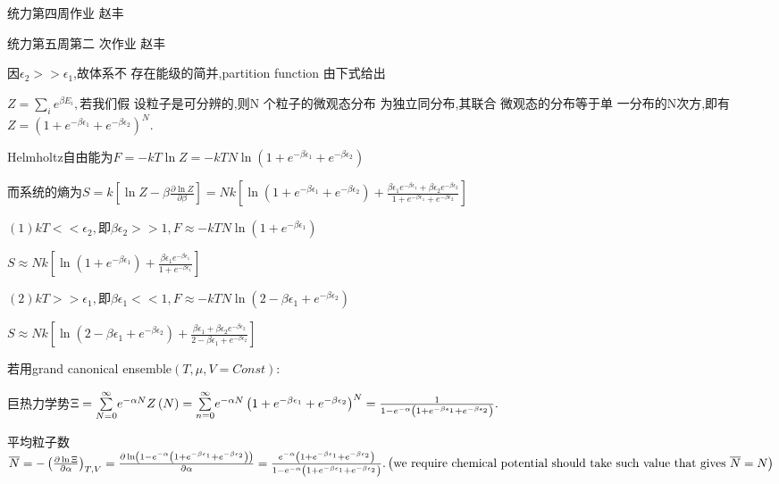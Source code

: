 \documentclass{ctexart}
\begin{document}
\bigskip 统力第四周作业 \qquad 
赵丰

\bigskip \bigskip 统力第五周第二%
次作业 \qquad 赵丰

\bigskip 


因$\epsilon _{2}>>\epsilon _{1}$,故体系不%
存在能级的简并,partition function 
由下式给出

$Z=\underset{i}{\sum }e^{\beta E_{i}},$若我们假%
设粒子是可分辨的,则N%
个粒子的微观态分布%
为独立同分布,其联合%
微观态的分布等于单%
一分布的N次方,即有\qquad $%
Z=\left( 1+e^{-\beta \epsilon _{1}}+e^{-\beta \epsilon _{2}}\right) ^{N}.$

Helmholtz自由能为\qquad $F=-kT\ln Z=-kTN\ln \left(
1+e^{-\beta \epsilon _{1}}+e^{-\beta \epsilon _{2}}\right) $

而系统的熵为\qquad $S=k\left[ \ln
Z-\beta \frac{\partial \ln Z}{\partial \beta }\right] =Nk\left[ \ln \left(
1+e^{-\beta \epsilon _{1}}+e^{-\beta \epsilon _{2}}\right) +\frac{\beta
\epsilon _{1}e^{-\beta \epsilon _{1}}+\beta \epsilon _{2}e^{-\beta \epsilon
_{2}}}{1+e^{-\beta \epsilon _{1}}+e^{-\beta \epsilon _{2}}}\right] $

$\left( 1\right) kT<<\epsilon _{2},$即$\beta \epsilon _{2}>>1,F\approx
-kTN\ln \left( 1+e^{-\beta \epsilon _{1}}\right) $

$S\approx Nk\left[ \ln \left( 1+e^{-\beta \epsilon _{1}}\right) +\frac{\beta
\epsilon _{1}e^{-\beta \epsilon _{1}}}{1+e^{-\beta \epsilon _{1}}}\right] $

\bigskip $\left( 2\right) kT>>\epsilon _{1},即 \beta \epsilon
_{1}<<1,F\approx -kTN\ln \left( 2-\beta \epsilon _{1}+e^{-\beta \epsilon
_{2}}\right) $

$S\approx Nk\left[ \ln \left( 2-\beta \epsilon _{1}+e^{-\beta \epsilon
_{2}}\right) +\frac{\beta \epsilon _{1}+\beta \epsilon _{2}e^{-\beta
\epsilon _{2}}}{2-\beta \epsilon _{1}+e^{-\beta \epsilon _{2}}}\right] $

\bigskip

\bigskip 若用grand canonical ensemble$\left( T,\mu
,V=Const\right) :$

巨热力学势$\Xi =\underset{N=0}{\overset{\infty 
}{\sum }}e^{-\alpha N}Z\left( N\right) =\underset{n=0}{\overset{\infty }{%
\sum }}e^{-\alpha N}\left( 1+e^{-\beta \epsilon _{1}}+e^{-\beta \epsilon
_{2}}\right) ^{N}=\frac{1}{1-e^{-\alpha }\left( 1+e^{-\beta \epsilon
_{1}}+e^{-\beta \epsilon _{2}}\right) }.$

平均粒子数$\overline{N}=-\left( \frac{\partial
\ln \Xi }{\partial \alpha }\right) _{T,V}=\frac{\partial \ln \left(
1-e^{-\alpha }\left( 1+e^{-\beta \epsilon _{1}}+e^{-\beta \epsilon
_{2}}\right) \right) }{\partial \alpha }=\allowbreak \frac{e^{-\alpha
}\left( 1+e^{-\beta \epsilon _{1}}+e^{-\beta \epsilon _{2}}\right) }{%
1-e^{-\alpha }\left( 1+e^{-\beta \epsilon _{1}}+e^{-\beta \epsilon
_{2}}\right) }\allowbreak \allowbreak .\left( \text{we require chemical
potential should take such value that gives }\overline{N}=N\right) $
\end{document}
